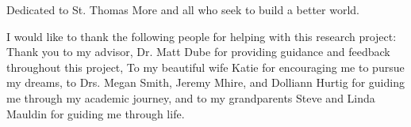 \begin{dedication}
Dedicated to St. Thomas More and all who seek to build a better world.
\end{dedication}

\begin{acknowledgements}
I would like to thank the following people for helping with this research project:
Thank you to my advisor, Dr. Matt Dube for providing guidance and feedback throughout this project, To my beautiful wife Katie for encouraging me to pursue my dreams, to Drs. Megan Smith, Jeremy Mhire, and Dolliann Hurtig for guiding me through my academic journey, and to my grandparents Steve and Linda Mauldin for guiding me through life.   
\end{acknowledgements}

\pagebreak

\tableofcontents

\pagebreak

\listoftables	

\pagebreak
\listoffigures		
\pagebreak		%



\mainmatter

\endinput
